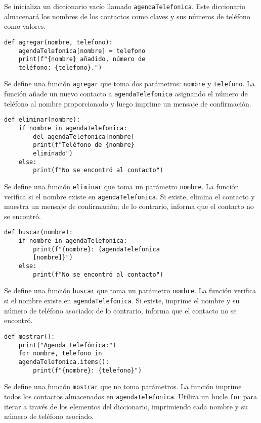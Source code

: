 \documentclass[conference]{IEEEtran}
\begin{document}
Se inicializa un diccionario vacío llamado \texttt{agendaTelefonica}. Este diccionario almacenará los nombres de los contactos como claves y sus números de teléfono como valores.

\begin{verbatim}
def agregar(nombre, telefono):
    agendaTelefonica[nombre] = telefono
    print(f"{nombre} añadido, número de 
    teléfono: {telefono}.")
\end{verbatim}

Se define una función \texttt{agregar} que toma dos parámetros: \texttt{nombre} y \texttt{telefono}. La función añade un nuevo contacto a \texttt{agendaTelefonica} asignando el número de teléfono al nombre proporcionado y luego imprime un mensaje de confirmación.

\begin{verbatim}
def eliminar(nombre):
    if nombre in agendaTelefonica:
        del agendaTelefonica[nombre]
        print(f"Teléfono de {nombre} 
        eliminado")
    else:
        print(f"No se encontró al contacto")
\end{verbatim}

Se define una función \texttt{eliminar} que toma un parámetro \texttt{nombre}. La función verifica si el nombre existe en \texttt{agendaTelefonica}. Si existe, elimina el contacto y muestra un mensaje de confirmación; de lo contrario, informa que el contacto no se encontró.

\begin{verbatim}
def buscar(nombre):
    if nombre in agendaTelefonica:
        print(f"{nombre}: {agendaTelefonica
        [nombre]}")
    else:
        print(f"No se encontró al contacto")
\end{verbatim}

Se define una función \texttt{buscar} que toma un parámetro \texttt{nombre}. La función verifica si el nombre existe en \texttt{agendaTelefonica}. Si existe, imprime el nombre y su número de teléfono asociado; de lo contrario, informa que el contacto no se encontró.

\begin{verbatim}
def mostrar():
    print("Agenda telefónica:")
    for nombre, telefono in 
    agendaTelefonica.items():
        print(f"{nombre}: {telefono}")
\end{verbatim}

Se define una función \texttt{mostrar} que no toma parámetros. La función imprime todos los contactos almacenados en \texttt{agendaTelefonica}. Utiliza un bucle \texttt{for} para iterar a través de los elementos del diccionario, imprimiendo cada nombre y su número de teléfono asociado.
\end{document}
